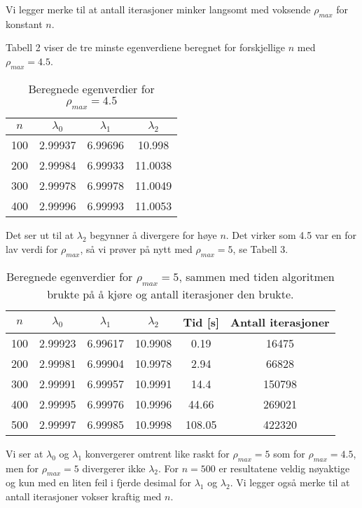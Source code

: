 \documentclass[norsk, 12pt]{article}
\begin{document}
Vi legger merke til at antall iterasjoner minker langsomt med voksende $\rho_{max}$ for konstant $n$.

Tabell 2 viser de tre minste egenverdiene beregnet for forskjellige $n$ med $\rho_{max}=4.5$. 
\begin{table}[h!]
 \centering

\begin{tabular}{|c|c|c|c|}\hline
 $n$ & $\lambda_0$ & $\lambda_1$ & $\lambda_2$\\ \hline
 100 & 2.99937 & 6.99696 & 10.998\\
 200 & 2.99984 & 6.99933 & 11.0038 \\
 300 & 2.99978 & 6.99978 & 11.0049 \\
 400 & 2.99996 & 6.99993 & 11.0053 \\ \hline 
\end{tabular}
\caption{Beregnede egenverdier for $\rho_{max} = 4.5$}
\end{table}

Det ser ut til at $\lambda_2$ begynner å divergere for høye $n$. Det virker som 4.5 var en for lav verdi for $\rho_{max}$, så vi
prøver på nytt med $\rho_{max} = 5$, se Tabell 3.

\begin{table}[h!]
 \centering
 \begin{tabular}{|c|c|c|c|c|c|}\hline
  $n$ & $\lambda_0$ & $\lambda_1$ & $\lambda_2$ & Tid [s] & Antall iterasjoner \\ \hline
  100 & 2.99923 & 6.99617 & 10.9908 & 0.19 & 16475\\
  200 & 2.99981 & 6.99904 & 10.9978 & 2.94 & 66828 \\
  300 & 2.99991 & 6.99957 & 10.9991 & 14.4 & 150798 \\
  400 & 2.99995 & 6.99976 & 10.9996 & 44.66 & 269021 \\
  500 & 2.99997 & 6.99985 & 10.9998 & 108.05 & 422320 \\ \hline 
 \end{tabular}
\caption{Beregnede egenverdier for $\rho_{max} = 5$, sammen med tiden algoritmen brukte på å kjøre og antall iterasjoner
den brukte.}
\end{table}

Vi ser at $\lambda_0$ og $\lambda_1$ konvergerer omtrent like raskt for $\rho_{max}=5$ som for $\rho_{max}=4.5$, men
for $\rho_{max}=5$ divergerer ikke $\lambda_2$. For $n=500$ er resultatene veldig nøyaktige og kun med en liten feil i
fjerde desimal for $\lambda_1$ og $\lambda_2$. Vi legger også merke til at antall iterasjoner vokser kraftig med $n$.
\end{document}

